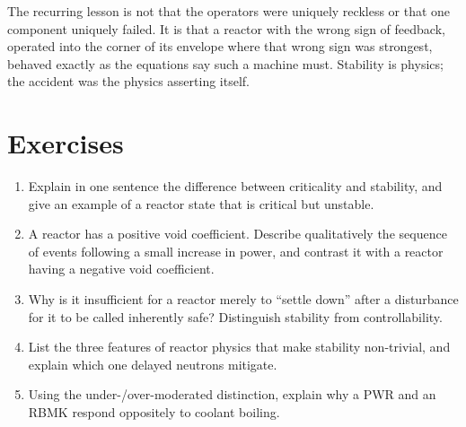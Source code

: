 The recurring lesson is not that the operators were uniquely reckless or that one
component uniquely failed. It is that a reactor with the wrong sign of feedback,
operated into the corner of its envelope where that wrong sign was strongest,
behaved exactly as the equations say such a machine must. Stability is physics;
the accident was the physics asserting itself.


\section*{Exercises}
\begin{enumerate}[leftmargin=*,itemsep=2pt]
\item Explain in one sentence the difference between criticality and stability, and give an example of a reactor state that is critical but unstable.
\item A reactor has a positive void coefficient. Describe qualitatively the sequence of events following a small increase in power, and contrast it with a reactor having a negative void coefficient.
\item Why is it insufficient for a reactor merely to ``settle down'' after a disturbance for it to be called inherently safe? Distinguish stability from controllability.
\item List the three features of reactor physics that make stability non-trivial, and explain which one delayed neutrons mitigate.
\item Using the under-/over-moderated distinction, explain why a PWR and an RBMK respond oppositely to coolant boiling.
\end{enumerate}
